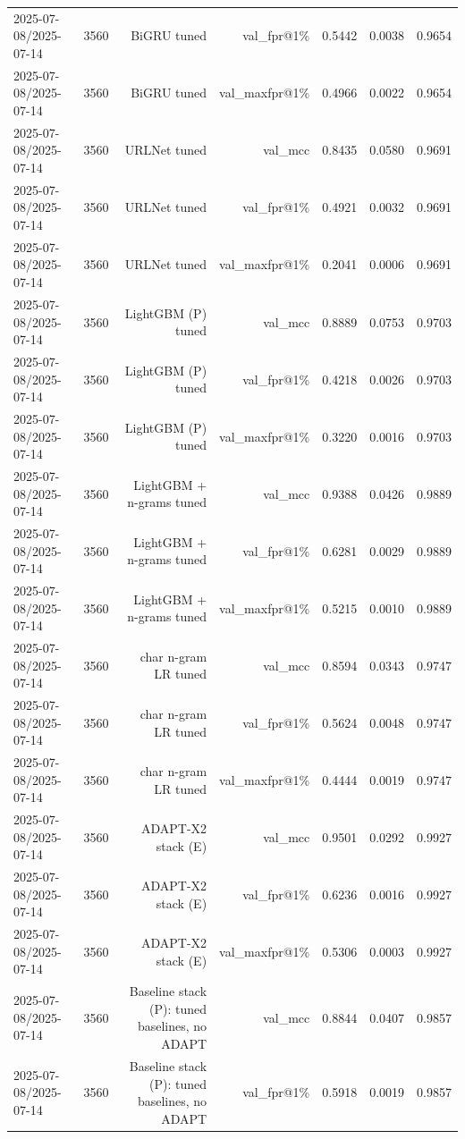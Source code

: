\begin{table}[t]
\begin{tabular}{llrrrrr}
2025-07-08/2025-07-14 & 3560 & BiGRU tuned & val\_fpr@1\% & 0.5442 & 0.0038 & 0.9654 \\
2025-07-08/2025-07-14 & 3560 & BiGRU tuned & val\_maxfpr@1\% & 0.4966 & 0.0022 & 0.9654 \\
2025-07-08/2025-07-14 & 3560 & URLNet tuned & val\_mcc & 0.8435 & 0.0580 & 0.9691 \\
2025-07-08/2025-07-14 & 3560 & URLNet tuned & val\_fpr@1\% & 0.4921 & 0.0032 & 0.9691 \\
2025-07-08/2025-07-14 & 3560 & URLNet tuned & val\_maxfpr@1\% & 0.2041 & 0.0006 & 0.9691 \\
2025-07-08/2025-07-14 & 3560 & LightGBM (P) tuned & val\_mcc & 0.8889 & 0.0753 & 0.9703 \\
2025-07-08/2025-07-14 & 3560 & LightGBM (P) tuned & val\_fpr@1\% & 0.4218 & 0.0026 & 0.9703 \\
2025-07-08/2025-07-14 & 3560 & LightGBM (P) tuned & val\_maxfpr@1\% & 0.3220 & 0.0016 & 0.9703 \\
2025-07-08/2025-07-14 & 3560 & LightGBM + n-grams tuned & val\_mcc & 0.9388 & 0.0426 & 0.9889 \\
2025-07-08/2025-07-14 & 3560 & LightGBM + n-grams tuned & val\_fpr@1\% & 0.6281 & 0.0029 & 0.9889 \\
2025-07-08/2025-07-14 & 3560 & LightGBM + n-grams tuned & val\_maxfpr@1\% & 0.5215 & 0.0010 & 0.9889 \\
2025-07-08/2025-07-14 & 3560 & char n-gram LR tuned & val\_mcc & 0.8594 & 0.0343 & 0.9747 \\
2025-07-08/2025-07-14 & 3560 & char n-gram LR tuned & val\_fpr@1\% & 0.5624 & 0.0048 & 0.9747 \\
2025-07-08/2025-07-14 & 3560 & char n-gram LR tuned & val\_maxfpr@1\% & 0.4444 & 0.0019 & 0.9747 \\
2025-07-08/2025-07-14 & 3560 & ADAPT-X2 stack (E) & val\_mcc & 0.9501 & 0.0292 & 0.9927 \\
2025-07-08/2025-07-14 & 3560 & ADAPT-X2 stack (E) & val\_fpr@1\% & 0.6236 & 0.0016 & 0.9927 \\
2025-07-08/2025-07-14 & 3560 & ADAPT-X2 stack (E) & val\_maxfpr@1\% & 0.5306 & 0.0003 & 0.9927 \\
2025-07-08/2025-07-14 & 3560 & Baseline stack (P): tuned baselines, no ADAPT & val\_mcc & 0.8844 & 0.0407 & 0.9857 \\
2025-07-08/2025-07-14 & 3560 & Baseline stack (P): tuned baselines, no ADAPT & val\_fpr@1\% & 0.5918 & 0.0019 & 0.9857 \\

\end{tabular}
\end{table}
